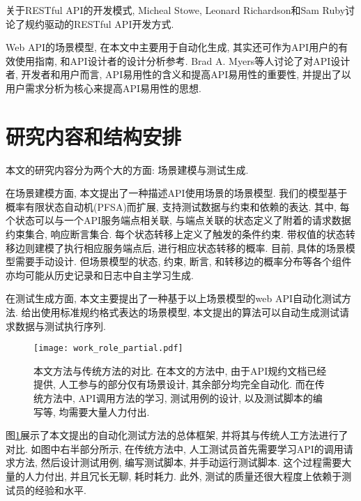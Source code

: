     	关于RESTful API的开发模式, Micheal Stowe\cite{michaels15}, Leonard Richardson和Sam Ruby\cite{leonardr07}讨论了规约驱动的RESTful API开发方式.
    	
    	Web API的场景模型, 在本文中主要用于自动化生成, 其实还可作为API用户的有效使用指南, 和API设计者的设计分析参考. Brad A. Myers等人\cite{bradm17}讨论了对API设计者, 开发者和用户而言, API易用性的含义和提高API易用性的重要性, 并提出了以用户需求分析为核心来提高API易用性的思想.

	\section{研究内容和结构安排}
	
	    本文的研究内容分为两个大的方面: 场景建模与测试生成.
	
	    在场景建模方面, 本文提出了一种描述API使用场景的场景模型. 我们的模型基于概率有限状态自动机(PFSA)而扩展, 支持测试数据与约束和依赖的表达. 其中, 每个状态可以与一个API服务端点相关联, 与端点关联的状态定义了附着的请求数据约束集合, 响应断言集合. 每个状态转移上定义了触发的条件约束. 带权值的状态转移边则建模了执行相应服务端点后, 进行相应状态转移的概率. 目前, 具体的场景模型需要手动设计. 但场景模型的状态, 约束, 断言, 和转移边的概率分布等各个组件亦均可能从历史记录和日志中自主学习生成.
	
        在测试生成方面, 本文主要提出了一种基于以上场景模型的web API自动化测试方法. 给出使用标准规约格式表达的场景模型, 本文提出的算法可以自动生成测试请求数据与测试执行序列.
        
        \begin{figure}[!htb]
            \centering
            \texttt{[image: work\_role\_partial.pdf]}
            \caption{本文方法与传统方法的对比. 在本文的方法中, 由于API规约文档已经提供, 人工参与的部分仅有场景设计, 其余部分均完全自动化. 而在传统方法中, API调用方法的学习, 测试用例的设计, 以及测试脚本的编写等, 均需要大量人力付出.}
            \label{fig:overview}
        \end{figure}
        
        图\ref{fig:overview}展示了本文提出的自动化测试方法的总体框架, 并将其与传统人工方法进行了对比. 如图中右半部分所示, 在传统方法中, 人工测试员首先需要学习API的调用请求方法, 然后设计测试用例, 编写测试脚本, 并手动运行测试脚本. 这个过程需要大量的人力付出, 并且冗长无聊, 耗时耗力. 此外, 测试的质量还很大程度上依赖于测试员的经验和水平.
        
